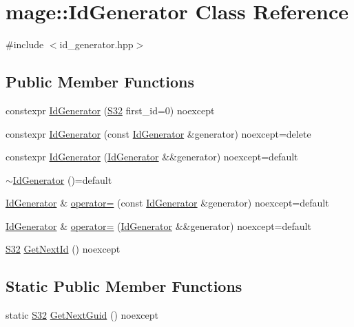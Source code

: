 \hypertarget{classmage_1_1_id_generator}{}\section{mage\+:\+:Id\+Generator Class Reference}
\label{classmage_1_1_id_generator}


{\ttfamily \#include $<$id\+\_\+generator.\+hpp$>$}

\subsection*{Public Member Functions}
\begin{DoxyCompactItemize}
\item 
constexpr \hyperlink{classmage_1_1_id_generator_a62eacd065b27320c207d72acf94df7a3}{Id\+Generator} (\hyperlink{namespacemage_a642e05c5c83642b6946703615cdbf2da}{S32} first\+\_\+id=0) noexcept
\item 
constexpr \hyperlink{classmage_1_1_id_generator_ac7c7bc2371a537ca742cf87288d75817}{Id\+Generator} (const \hyperlink{classmage_1_1_id_generator}{Id\+Generator} \&generator) noexcept=delete
\item 
constexpr \hyperlink{classmage_1_1_id_generator_a5d6eb6a2ef08cd4ed765a61f9c330868}{Id\+Generator} (\hyperlink{classmage_1_1_id_generator}{Id\+Generator} \&\&generator) noexcept=default
\item 
\hyperlink{classmage_1_1_id_generator_a70161ab5b10294ebba1ace7a3b0f8d31}{$\sim$\+Id\+Generator} ()=default
\item 
\hyperlink{classmage_1_1_id_generator}{Id\+Generator} \& \hyperlink{classmage_1_1_id_generator_ac731a36eb2824cb8f6633d0df543847c}{operator=} (const \hyperlink{classmage_1_1_id_generator}{Id\+Generator} \&generator) noexcept=default
\item 
\hyperlink{classmage_1_1_id_generator}{Id\+Generator} \& \hyperlink{classmage_1_1_id_generator_abf29fa46e1bb19dd878462fc2610e3a8}{operator=} (\hyperlink{classmage_1_1_id_generator}{Id\+Generator} \&\&generator) noexcept=default
\item 
\hyperlink{namespacemage_a642e05c5c83642b6946703615cdbf2da}{S32} \hyperlink{classmage_1_1_id_generator_a9e0e86e5feab919f5ac5ab4ad8f51b09}{Get\+Next\+Id} () noexcept
\end{DoxyCompactItemize}
\subsection*{Static Public Member Functions}
\begin{DoxyCompactItemize}
\item 
static \hyperlink{namespacemage_a642e05c5c83642b6946703615cdbf2da}{S32} \hyperlink{classmage_1_1_id_generator_a61c706df62168d306c47b79aed4b2e07}{Get\+Next\+Guid} () noexcept
\end{DoxyCompactItemize}
